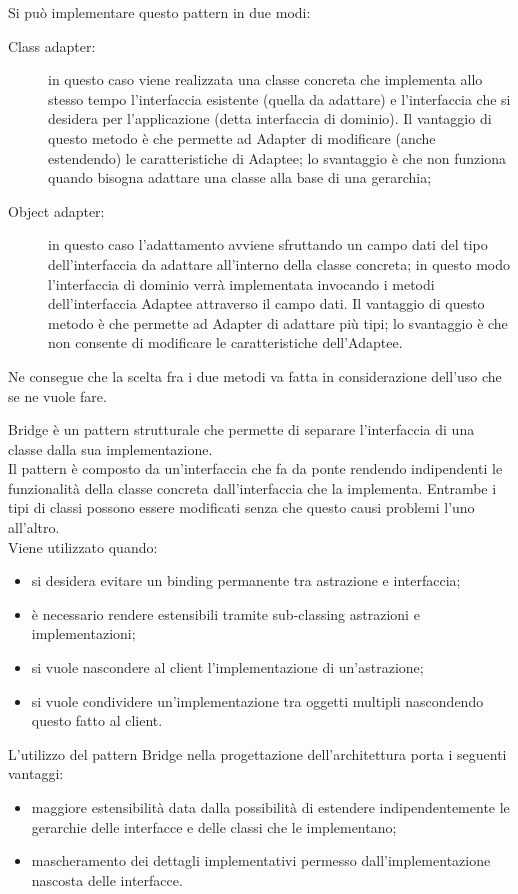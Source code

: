 Si può implementare questo pattern in due modi:
\begin{description}
\item[Class adapter:] in questo caso viene realizzata una classe concreta che implementa allo stesso tempo l'interfaccia esistente (quella da adattare) e l'interfaccia che si desidera per l'applicazione (detta interfaccia di dominio). Il vantaggio di questo metodo è che permette ad Adapter di modificare (anche estendendo) le caratteristiche di Adaptee; lo svantaggio è che non funziona quando bisogna adattare una classe alla base di una gerarchia;
\item[Object adapter:] in questo caso l'adattamento avviene sfruttando un campo dati del tipo dell'interfaccia da adattare all'interno della classe concreta; in questo modo l'interfaccia di dominio verrà implementata invocando i metodi dell'interfaccia Adaptee attraverso il campo dati. Il vantaggio di questo metodo è che permette ad Adapter di adattare più tipi; lo svantaggio è che non consente di modificare le caratteristiche dell'Adaptee.
\end{description}
Ne consegue che la scelta fra i due metodi va fatta in considerazione dell'uso che se ne vuole fare.

 \label{app:bridge}
Bridge è un pattern strutturale che permette di separare l’interfaccia di una classe dalla sua implementazione. \\
Il pattern è composto da un’interfaccia che fa da ponte rendendo indipendenti le funzionalità della classe concreta dall’interfaccia che la implementa. Entrambe i tipi di classi possono essere modificati senza che questo causi problemi l’uno all’altro. \\
Viene utilizzato quando:
\begin{itemize}
\item si desidera evitare un binding permanente tra astrazione e interfaccia;
\item è necessario rendere estensibili tramite sub-classing astrazioni e implementazioni;
\item si vuole nascondere al client l'implementazione di un'astrazione;
\item si vuole condividere un'implementazione tra oggetti multipli nascondendo questo fatto al client.
\end{itemize}

L’utilizzo del pattern Bridge nella progettazione dell’architettura porta i seguenti vantaggi:
\begin{itemize}
\item maggiore estensibilità data dalla possibilità di estendere indipendentemente le gerarchie delle interfacce e delle classi che le implementano;
\item mascheramento dei dettagli implementativi permesso dall'implementazione nascosta delle interfacce.
\end{itemize}
